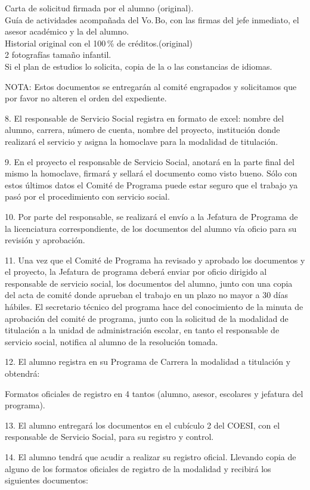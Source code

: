\begin{footnotesize}
\begin{Obs}
Carta de solicitud firmada por el alumno (original).\\ 
Guía de actividades acompañada del Vo.\,Bo, con las firmas del jefe
inmediato, el asesor académico y la del alumno.\\ 
Historial original con el 100\,\% de créditos.(original)\\ 
2 fotografías tamaño infantil.\\ 
Si el plan de estudios lo solicita, copia de la o las constancias de
idiomas. 

\smallskip
NOTA: Estos documentos se entregarán al comité engrapados y solicitamos que
por favor no alteren el orden del expediente.
\item[8.] El responsable de Servi\-cio So\-cial re\-gis\-tra en for\-ma\-to de excel: nom\-bre
del alum\-no, carrera, número de cuenta, nombre del proyecto, institución
donde realizará el servicio y asigna la homoclave para la modalidad de
titulación. 

\item[9.] En el proyecto el responsable de Servicio Social, anotará en la parte
final del mismo la homoclave, firmará y sellará el documento como visto
bueno. Sólo con estos últimos datos el Comité de Programa puede estar
seguro que el trabajo ya pasó por el procedimiento con servicio social. 
\item[10.] Por parte del responsable, se realizará el envío a la Jefatura de
Programa de la licenciatura correspondiente, de los documentos del alumno
vía oficio para su revisión y aprobación. 
\item[11.] Una vez que el Comité de Programa ha revisado y aprobado los documentos
y el proyecto, la Jefatura de programa deberá enviar por oficio dirigido al
responsable de servicio social, los documentos del alumno, junto con una
copia del acta de comité donde aprueban el trabajo en un plazo no mayor a
30 días hábiles. El secretario técnico del programa hace del conocimiento
de la minuta de aprobación del comité de programa, junto con la solicitud
de la modalidad de titulación a la unidad de administración escolar, en
tanto el responsable de servicio social, notifica al alumno de la
resolución tomada. 
\item[12.] El alumno registra en su Programa de Carrera la modalidad a titulación y
obtendrá: 

Formatos oficiales de registro en 4 tantos (alumno, asesor, escolares y
jefatura del programa). 
\item[13.] El alumno entregará los documentos en el cubículo 2 del COESI, con el
responsable de Servicio Social, para su registro y control. 
\item[14.] El alumno tendrá que acudir a realizar su registro oficial. Llevando
copia de alguno de los formatos oficiales de registro de la modalidad y
recibirá los siguientes documentos: 


\end{Obs}
\end{footnotesize}

